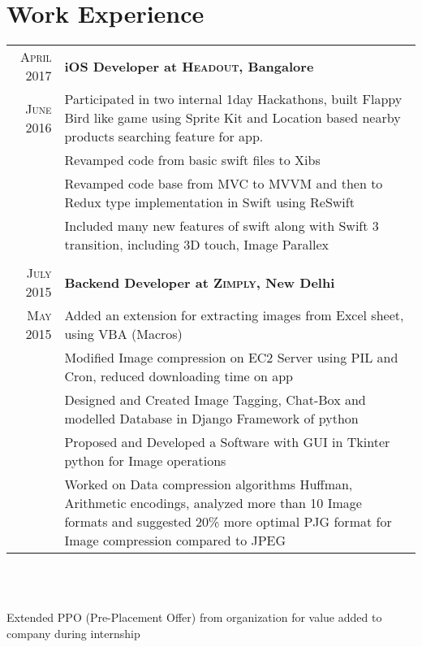 \documentclass[a4paper,10pt]{article}
\begin{document}
\section{Work Experience}
\begin{tabular}{r|p{16cm}}

\textsc{April 2017} & \textbf{iOS Developer at \textsc{Headout}, Bangalore} \\
 \textsc{June 2016} & Participated in two internal 1day Hackathons, built Flappy Bird like game using Sprite Kit and Location based nearby products searching feature for app.\\
& Revamped code from basic swift files to Xibs\\
& Revamped code base from MVC to MVVM and then to Redux type implementation in Swift using ReSwift\\
& Included many new features of swift along with Swift 3 transition, including 3D touch, Image Parallex\\\multicolumn{2}{c}{}\\
 
 \textsc{July 2015} & \textbf{Backend Developer at \textsc{Zimply}, New Delhi} \\
 \textsc{May 2015} & Added an extension for extracting images from Excel sheet, using VBA (Macros)\\
& Modified Image compression on EC2 Server using PIL and Cron, reduced downloading time on app\\
& Designed and Created Image Tagging, Chat-Box and modelled Database in Django Framework of python\\
& Proposed and Developed a Software with GUI in Tkinter python for Image operations\\
& Worked on Data compression algorithms Huffman, Arithmetic encodings, analyzed more than 10 Image formats and suggested 20\% more optimal PJG format for Image compression compared to  JPEG\\
\end{tabular}\\\\
\centerline{Extended PPO (Pre-Placement Offer) from organization for value added to company during internship}\\

\end{document}
